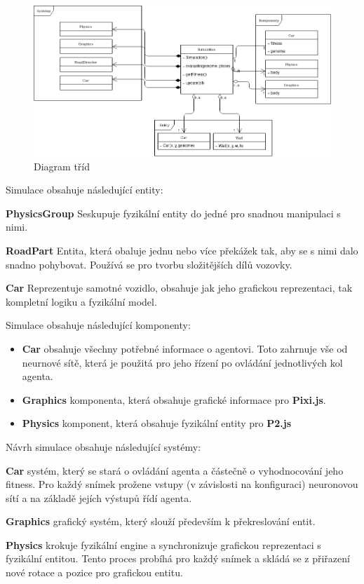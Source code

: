 \begin{figure}[H]
	\centering
 	\includegraphics[width=0.7\linewidth]{classDiagram}
	\caption{Diagram tříd}
	\label{fig:class-diagram}
\end{figure}

Simulace obsahuje následující entity:

\textbf{PhysicsGroup} Seskupuje fyzikální entity do jedné pro snadnou manipulaci s nimi.

\textbf{RoadPart} Entita, která obaluje jednu nebo více překážek tak, aby se s nimi dalo snadno pohybovat. Používá se pro tvorbu složitějších dílů vozovky.

\textbf{Car} Reprezentuje samotné vozidlo, obsahuje jak jeho grafickou reprezentaci, tak kompletní logiku a fyzikální model.

Simulace obsahuje následující komponenty:
\begin{itemize}
	\item \textbf{Car} obsahuje všechny potřebné informace o agentovi. Toto zahrnuje vše od neurnové sítě, která je použitá pro jeho řízení po ovládání jednotlivých kol agenta.
	\item \textbf{Graphics} komponenta, která obsahuje grafické informace pro \textbf{Pixi.js}.
	\item \textbf{Physics} komponent, která obsahuje fyzikální entity pro \textbf{P2.js}
\end{itemize}

Návrh simulace obsahuje následující systémy:

\textbf{Car} systém, který se stará o ovládání agenta a částečně o vyhodnocování jeho fitness. Pro každý snímek prožene vstupy (v závislosti na konfiguraci) neuronovou sítí a na základě jejích výstupů řídí agenta.

\textbf{Graphics} grafický systém, který slouží především k překreslování entit.

\textbf{Physics} krokuje fyzikální engine a synchronizuje grafickou reprezentaci s fyzikální entitou. Tento proces probíhá pro každý snímek a skládá se z přiřazení nové rotace a pozice pro grafickou entitu.

